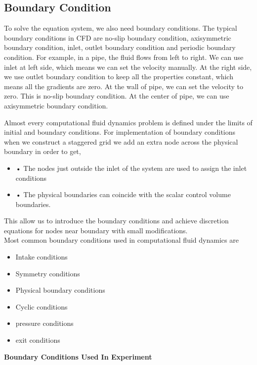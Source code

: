 	
\subsection{Boundary Condition}




To solve the equation system, we also need boundary conditions. The typical boundary conditions in CFD are no-slip boundary condition, axisymmetric boundary condition, inlet, outlet boundary condition and periodic boundary condition.
For example, in a pipe, the fluid flows from left to right. We can use inlet at left side, which means we can set the velocity manually. At the right side, we use outlet boundary condition to keep all the properties constant, which means all the gradients are zero. At the wall of pipe, we can set the velocity to zero. This is no-slip boundary condition. At the center of pipe, we can use axisymmetric boundary condition.

Almost every computational fluid dynamics problem is defined under the limits of initial and boundary conditions. For implementation of boundary conditions when we construct a staggered grid we add an extra node across the physical boundary in order to get,	
\begin{itemize}
	\item •	The nodes just outside the inlet of the system are used to assign the inlet conditions
	\item •	The physical boundaries can coincide with the scalar control volume boundaries.
\end{itemize}

This allow us to introduce the boundary conditions and achieve discretion equations for nodes near boundary with small modifications.
\\

Most common boundary conditions used in computational fluid dynamics are
\begin{itemize}
	\item Intake conditions
	\item Symmetry conditions
	\item Physical boundary conditions
	\item Cyclic conditions
	\item pressure conditions
	\item exit conditions
\end{itemize}



\textbf{Boundary Conditions Used In Experiment}

